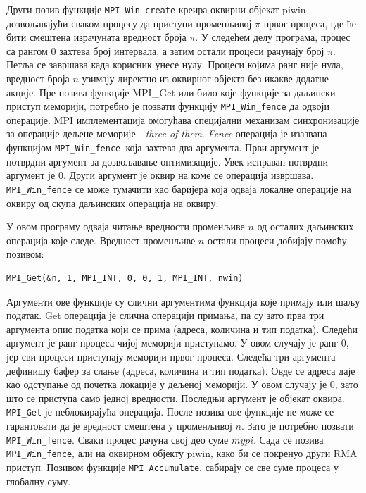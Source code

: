 Други позив функције \texttt{MPI\_Win\_create} креира оквирни објекат piwin дозвољавајући сваком процесу да приступи променљивој $\pi$ првог процеса, где ће бити смештена израчуната вредност броја $\pi$.
У следећем делу програма, процес са рангом 0 захтева број интервала, а затим остали процеси рачунају број $\pi$. Петља се завршава када корисник унесе нулу. Процеси којима ранг није нула, вредност броја $n$ узимају  директно из оквирног објекта без икакве додатне акције. Пре позива функције MPI\_Get или било које функције за даљински приступ меморији, потребно је позвати функцију \texttt{MPI\_Win\_fence} да одвоји операције. MPI имплементација омогућава специјални механизам синхронизације за операције дељене меморије - \textit{three of them}. \textit{Fence} операција је изазвана функцијом \texttt{MPI\_Win\_fence }која захтева два аргумента. Први аргумент је потврдни аргумент за дозвољавање оптимизације. Увек исправан потврдни аргумент је 0. Други аргумент је оквир на коме се операција извршава. \texttt{MPI\_Win\_fence} се може тумачити као баријера која одваја локалне операције на оквиру од скупа даљинских операција на оквиру.

У овом програму одваја читање вредности променљиве $n$ од осталих даљинских операција које следе. Вредност променљиве $n$ остали процеси добијају помоћу позивом:

\begin{verbatim}
MPI_Get(&n, 1, MPI_INT, 0, 0, 1, MPI_INT, nwin)
\end{verbatim}

Аргументи ове функције су слични аргументима функција које примају или шаљу податак. Get операција је слична операцији примања, па су зато прва три аргумента опис податка који се прима (адреса, количина и тип податка).  Следећи аргумент је ранг процеса чијој меморији приступамо. У овом случају је ранг 0, јер сви процеси приступају меморији првог процеса.
Следећа три аргумента дефинишу бафер за слање (адреса, количина и тип податка). Овде се адреса даје као одступање од почетка локације у дељеној меморији. У овом случају је 0, зато што се приступа само једној вредности. Последњи аргумент је објекат оквира.  \texttt{MPI\_Get} је неблокирајућа операција. После позива ове функције не може се гарантовати да је вредност смештена у променљивој $n$. Зато је потребно позвати \texttt{MPI\_Win\_fence}. Сваки процес рачуна свој део суме $mypi$. Сада се позива \texttt{MPI\_Win\_fence}, али на оквирном објекту piwin, како би се покренуо други 
RMA приступ. Позивом функције \texttt{MPI\_Accumulate}, сабирају се све суме процеса у глобалну суму.

